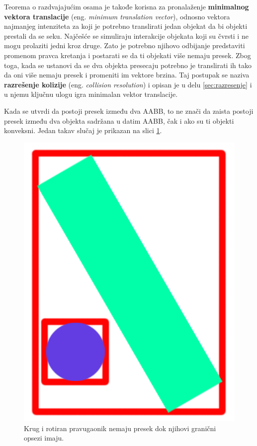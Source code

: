 \documentclass[12pt,oneside]{memoir}
\begin{document}
Teorema o razdvajajućim osama je takođe korisna za pronalaženje \textbf{minimalnog vektora translacije} (eng. {\em minimum translation vector}), odnosno
vektora najmanjeg intenziteta za koji je potrebno translirati jedan objekat da bi objekti prestali da se seku.
Najčešće se simuliraju interakcije objekata koji su čvrsti i ne mogu prolaziti jedni kroz druge.
Zato je potrebno njihovo odbijanje predstaviti promenom pravca kretanja i postarati se da ti objekati više nemaju presek.
Zbog toga, kada se ustanovi da se dva objekta presecaju potrebno je translirati ih tako da oni više nemaju presek i promeniti im vektore brzina.
Taj postupak se naziva \textbf{razrešenje kolizije} (eng. {\em collision resolution}) i opisan je u delu \ref{sec:razresenje} i u njemu ključnu ulogu igra minimalan vektor translacije.

Kada se utvrdi da postoji presek između dva AABB, to ne znači da zaista postoji presek između dva objekta
sadržana u datim AABB, čak i ako su ti objekti konveksni. Jedan takav slučaj je prikazan na slici \ref{fig:2dfalse}. 

\begin{figure}[h!]
	\centering
	\includegraphics[scale=0.2]{2dfalseCol.png}
	\caption{Krug i rotiran pravugaonik nemaju presek dok njihovi granični opsezi imaju.}
	\label{fig:2dfalse}
\end{figure}
\end{document}

